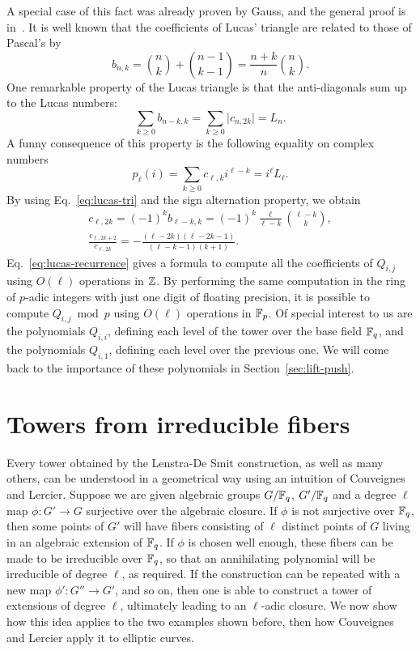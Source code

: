 \documentclass{sig-alternate}
\begin{document}
A special case of this fact was already proven by Gauss, and the
general proof is in~\cite[Proposition~1]{gurak06}.  It is well known
that the coefficients of Lucas' triangle are related to those of
Pascal's by
\begin{equation}
  \label{eq:lucas-tri}
  b_{n,k} = \binom{n}{k} + \binom{n-1}{k-1} = \frac{n+k}{n}\binom{n}{k}.
\end{equation}
One remarkable property of the Lucas triangle is that the
anti-diagonals sum up to the Lucas numbers:
\begin{equation}
  \sum_{k\ge0} b_{n-k,k} = \sum_{k\ge0} \lvert c_{n,2k}\rvert = L_n.
\end{equation}
A funny consequence of this property is the following equality on
complex numbers
\begin{equation}
  \label{eq:lucas-fun}
  p_\ell(i) = \sum_{k\ge0} c_{\ell,k}i^{\ell-k} = i^\ell L_\ell.
\end{equation}
By using Eq.~\eqref{eq:lucas-tri} and the sign alternation property,
we obtain 
\begin{gather}
  c_{\ell,2k} = (-1)^kb_{\ell-k,k} = (-1)^k\frac{\ell}{\ell-k}\binom{\ell-k}{k},\\
  \label{eq:lucas-recurrence}
  \frac{c_{\ell,2k+2}}{c_{\ell,2k}} = 
  -\frac{(\ell-2k)(\ell-2k-1)}{(\ell-k-1)(k+1)}.
\end{gather}
Eq.~\eqref{eq:lucas-recurrence} gives a formula to compute all the
coefficients of $Q_{i,j}$ using $O(\ell)$ operations in $\mathbb{Z}$. By
performing the same computation in the ring of $p$-adic integers with
just one digit of floating precision, it is possible to compute
$Q_{i,j}\bmod p$ using $O(\ell)$ operations in $\mathbb{F}_p$. Of special
interest to us are the polynomials $Q_{i,i}$, defining each level of
the tower over the base field $\mathbb{F}_q$, and the polynomials $Q_{i,1}$,
defining each level over the previous one. We will come back to the
importance of these polynomials in Section~\ref{sec:lift-push}.



\section{Towers from irreducible fibers}
\label{sec:fibers}
Every tower obtained by the Lenstra-De Smit construction, as well as
many others, can be understood in a geometrical way using an intuition
of Couveignes and Lercier\cite{couveignes+lercier11}. Suppose we are
given algebraic groups $G/\mathbb{F}_q$, $G'/\mathbb{F}_q$ and a degree $\ell$ map
$\phi:G'\to G$ surjective over the algebraic closure. If $\phi$ is not
surjective over $\mathbb{F}_q$, then some points of $G'$ will have fibers
consisting of $\ell$ distinct points of $G$ living in an algebraic
extension of $\mathbb{F}_q$. If $\phi$ is chosen well enough, these fibers can
be made to be irreducible over $\mathbb{F}_q$, so that an annihilating
polynomial will be irreducible of degree $\ell$, as required. If the
construction can be repeated with a new map $\phi':G''\to G'$, and so
on, then one is able to construct a tower of extensions of degree
$\ell$, ultimately leading to an $\ell$-adic closure. We now show how
this idea applies to the two examples shown before, then how
Couveignes and Lercier apply it to elliptic curves.
\end{document}
